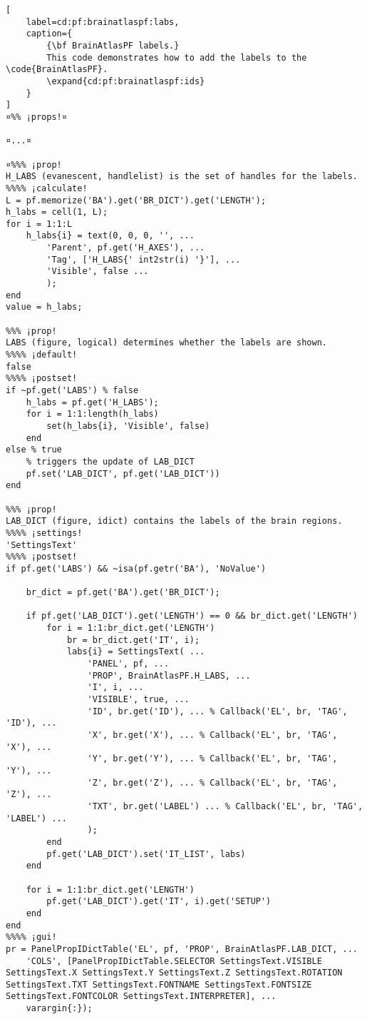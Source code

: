 \documentclass{tufte-handout}
\begin{document}
\begin{lstlisting}[
	label=cd:pf:brainatlaspf:labs,
	caption={
		{\bf BrainAtlasPF labels.}
		This code demonstrates how to add the labels to the \code{BrainAtlasPF}.
		\expand{cd:pf:brainatlaspf:ids}
	}
]
¤%% ¡props!¤

¤...¤

¤%%% ¡prop!
H_LABS (evanescent, handlelist) is the set of handles for the labels.
%%%% ¡calculate!
L = pf.memorize('BA').get('BR_DICT').get('LENGTH');
h_labs = cell(1, L);
for i = 1:1:L
    h_labs{i} = text(0, 0, 0, '', ...
        'Parent', pf.get('H_AXES'), ...
        'Tag', ['H_LABS{' int2str(i) '}'], ...
        'Visible', false ...
        );
end
value = h_labs;

%%% ¡prop!
LABS (figure, logical) determines whether the labels are shown.
%%%% ¡default!
false
%%%% ¡postset!
if ~pf.get('LABS') % false
    h_labs = pf.get('H_LABS');
    for i = 1:1:length(h_labs)
        set(h_labs{i}, 'Visible', false)
    end        
else % true
	% triggers the update of LAB_DICT
	pf.set('LAB_DICT', pf.get('LAB_DICT'))
end

%%% ¡prop!
LAB_DICT (figure, idict) contains the labels of the brain regions.
%%%% ¡settings!
'SettingsText'
%%%% ¡postset!
if pf.get('LABS') && ~isa(pf.getr('BA'), 'NoValue')

    br_dict = pf.get('BA').get('BR_DICT');

    if pf.get('LAB_DICT').get('LENGTH') == 0 && br_dict.get('LENGTH')
        for i = 1:1:br_dict.get('LENGTH')
            br = br_dict.get('IT', i);
            labs{i} = SettingsText( ...
                'PANEL', pf, ...
                'PROP', BrainAtlasPF.H_LABS, ...
                'I', i, ...
                'VISIBLE', true, ...
                'ID', br.get('ID'), ... % Callback('EL', br, 'TAG', 'ID'), ...
                'X', br.get('X'), ... % Callback('EL', br, 'TAG', 'X'), ...
                'Y', br.get('Y'), ... % Callback('EL', br, 'TAG', 'Y'), ...
                'Z', br.get('Z'), ... % Callback('EL', br, 'TAG', 'Z'), ...
                'TXT', br.get('LABEL') ... % Callback('EL', br, 'TAG', 'LABEL') ...
                );
        end
        pf.get('LAB_DICT').set('IT_LIST', labs)
    end
    
    for i = 1:1:br_dict.get('LENGTH')
        pf.get('LAB_DICT').get('IT', i).get('SETUP')
    end
end
%%%% ¡gui!
pr = PanelPropIDictTable('EL', pf, 'PROP', BrainAtlasPF.LAB_DICT, ...
    'COLS', [PanelPropIDictTable.SELECTOR SettingsText.VISIBLE SettingsText.X SettingsText.Y SettingsText.Z SettingsText.ROTATION SettingsText.TXT SettingsText.FONTNAME SettingsText.FONTSIZE SettingsText.FONTCOLOR SettingsText.INTERPRETER], ...
    varargin{:});


\end{lstlisting}
\end{document}

